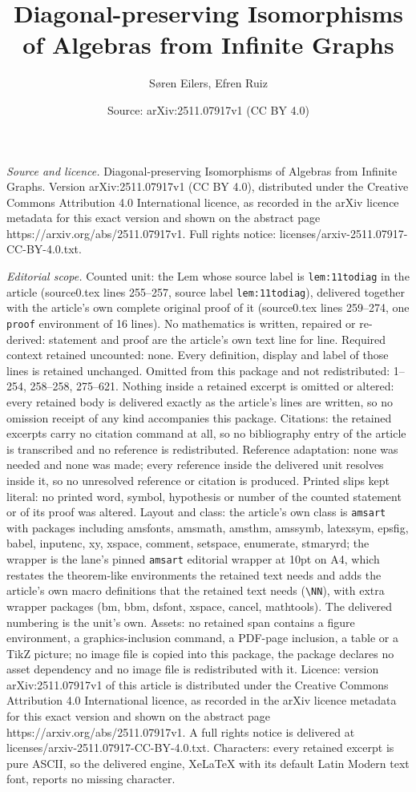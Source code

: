 \documentclass[10pt,a4paper]{amsart}
\title[Diagonal-preserving Isomorphisms of Algebras from Infinite G]{Diagonal-preserving Isomorphisms of Algebras from Infinite Graphs}
\author{S{\o}ren Eilers, Efren Ruiz}
\date{Source: arXiv:2511.07917v1 (CC BY 4.0)}
\begin{document}
\maketitle

\noindent\emph{Source and licence.} Diagonal-preserving Isomorphisms of Algebras from Infinite Graphs. Version arXiv:2511.07917v1 (CC BY 4.0), distributed under the Creative Commons Attribution 4.0 International licence, as recorded in the arXiv licence metadata for this exact version and shown on the abstract page https://arxiv.org/abs/2511.07917v1. Full rights notice: licenses/arxiv-2511.07917-CC-BY-4.0.txt.\par\smallskip

\noindent\textit{Editorial scope.} Counted unit: the Lem whose source label is \texttt{lem:11todiag} in the article (source0.tex lines 255--257, source label \texttt{lem:11todiag}), delivered together with the article's own complete original proof of it (source0.tex lines 259--274, one \texttt{proof} environment of 16 lines). No mathematics is written, repaired or re-derived: statement and proof are the article's own text line for line. Required context retained uncounted: none. Every definition, display and label of those lines is retained unchanged. Omitted from this package and not redistributed: 1--254, 258--258, 275--621. Nothing inside a retained excerpt is omitted or altered: every retained body is delivered exactly as the article's lines are written, so no omission receipt of any kind accompanies this package. Citations: the retained excerpts carry no citation command at all, so no bibliography entry of the article is transcribed and no reference is redistributed. Reference adaptation: none was needed and none was made; every reference inside the delivered unit resolves inside it, so no unresolved reference or citation is produced. Printed slips kept literal: no printed word, symbol, hypothesis or number of the counted statement or of its proof was altered. Layout and class: the article's own class is \texttt{amsart} with packages including amsfonts, amsmath, amsthm, amssymb, latexsym, epsfig, babel, inputenc, xy, xspace, comment, setspace, enumerate, stmaryrd; the wrapper is the lane's pinned \texttt{amsart} editorial wrapper at 10pt on A4, which restates the theorem-like environments the retained text needs and adds the article's own macro definitions that the retained text needs (\texttt{\textbackslash NN}), with extra wrapper packages (bm, bbm, dsfont, xspace, cancel, mathtools). The delivered numbering is the unit's own. Assets: no retained span contains a figure environment, a graphics-inclusion command, a PDF-page inclusion, a table or a TikZ picture; no image file is copied into this package, the package declares no asset dependency and no image file is redistributed with it. Licence: version arXiv:2511.07917v1 of this article is distributed under the Creative Commons Attribution 4.0 International licence, as recorded in the arXiv licence metadata for this exact version and shown on the abstract page https://arxiv.org/abs/2511.07917v1. A full rights notice is delivered at licenses/arxiv-2511.07917-CC-BY-4.0.txt. Characters: every retained excerpt is pure ASCII, so the delivered engine, XeLaTeX with its default Latin Modern text font, reports no missing character.
\end{document}
